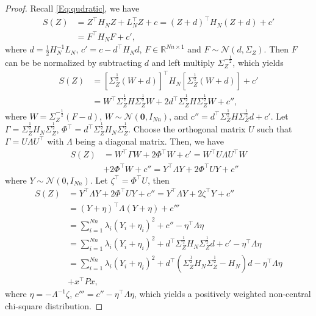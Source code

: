 \documentclass[10pt,a4paper]{amsart}
\begin{document}
\begin{proof}
   Recall \eqref{Eq:qudratic}, we have
    \begin{equation*}
        \begin{aligned}
        S(Z)&= Z^\top H_N Z+L_N^\top Z+c=\left( Z+d\right)^\top H_N(Z+d) +c' \\
        &= F^\top H_N F+c',
        \end{aligned}
    \end{equation*}
    where $d=\frac{1}{2}H_N^{-1}L_N$, $c'=c-d^\top H_N d$, $F\in \mathbb{R}^{Nn\times1}$ and $F\sim
\mathcal{N}(d,\Sigma_Z)$. Then $F$ can be be normalized by subtracting $d$ and left multiply $\Sigma_Z^{-\frac{1}{2}}$, which yields 
\begin{equation*}
    \begin{aligned}
        S(Z)&= \left[\Sigma_Z^{\frac{1}{2}}\left( W\!+\!d\right)\right]^\top \! H_N \left[\Sigma_Z^{\frac{1}{2}}\left( W\!+\!d\right)\right]+c'\\
        &= W^\top \Sigma_Z^{\frac{1}{2}} H \Sigma_Z^{\frac{1}{2}}W +2d^\top \Sigma_Z^{\frac{1}{2}} H \Sigma_Z^{\frac{1}{2}}W +c'',
    \end{aligned}
\end{equation*} 
where $W=\Sigma_Z^{-\frac{1}{2}}\left( F-d\right)$, $W \sim \mathcal{N}(\mathbf{0},I_{Nn})$, and $c''=d^\top \Sigma_Z^{\frac{1}{2}} H \Sigma_Z^{\frac{1}{2}}d+c'$.
Let $\Gamma=\Sigma_Z^{\frac{1}{2}} H_N \Sigma_Z^{\frac{1}{2}}$, $\Phi
^\top =d^\top \Sigma_Z^{\frac{1}{2}} H_N \Sigma_Z^{\frac{1}{2}}$. Choose the orthogonal matrix $U$ such that $\Gamma= U\Lambda U^\top$ with $\Lambda$ being a diagonal matrix. Then, we have
\begin{equation*}
    \begin{aligned}
        S(Z)&=W^\top \Gamma W+ 2 \Phi
        ^\top W+c'= W^\top U \Lambda U^\top W \\
        & +2\Phi
        ^\top W+c'' =Y^\top \Lambda Y+2\Phi^\top UY+c''
    \end{aligned}
\end{equation*}
where $Y\sim \mathcal{N}(0,I_{Nn})$. Let $\zeta^\top=\Phi^\top U$, then
\begin{equation*}
    \begin{aligned}
        S(Z)&= Y^\top \Lambda Y+2\Phi^\top UY+c''= Y^\top \Lambda Y+2\zeta^\top Y+c''\\&= (Y+\eta)^\top \Lambda (Y+\eta)+c'''\\&=\sum_{i=1}^{Nn}\lambda_i\left( Y_i+\eta_i \right)^2+c''-\eta^\top \Lambda \eta\\
        &=\sum_{i=1}^{Nn}\lambda_i\left( Y_i+\eta_i \right)^2+d^\top \Sigma_Z^{\frac{1}{2}} H_N \Sigma_Z^{\frac{1}{2}}d+c'- \eta^\top \Lambda \eta \\
        &=\sum_{i=1}^{Nn}\lambda_i\left( Y_i+\eta_i \right)^2+d^\top (\Sigma_Z^{\frac{1}{2}} H_N \Sigma_Z^{\frac{1}{2}}-H_N)d-\eta^\top\Lambda \eta\\&+x^\top Px ,
    \end{aligned}
\end{equation*}
where $\eta=-\Lambda^{-1}\zeta$, $c'''=c''-\eta^\top \Lambda \eta$, which yields a positively weighted non-central chi-square distribution.
\end{proof}
\end{document}
